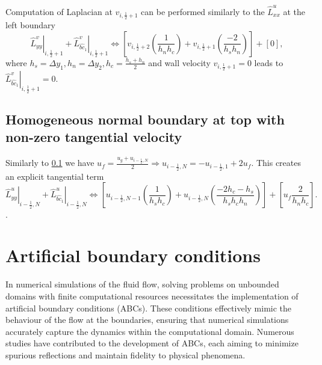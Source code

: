 \documentclass{article}
\numberwithin{equation}{section}
\begin{document}
Computation of Laplacian at $v_{i,\frac{1}{2}+1}$ can be performed similarly to the $\hat{L}_{xx}^u$ at the left boundary 
\begin{equation}
	\left.\hat{L}_{yy}^v\right|_{i,\frac{1}{2}+1}+\left.\hat{L}^v_{\hat{bc}_1}\right|_{i,\frac{1}{2}+1} \iff  \left [v_{i,\frac{1}{2}+2}\left(\frac{1}{h_n h_c}\right)+v_{i,\frac{1}{2}+1}\left(\frac{-2}{h_s h_n}\right)\right]+\left[0\right],
\end{equation}
where $h_s={\Delta y_1},h_n=\Delta y_2,h_c=\frac{h_s+h_n}{2}$ and wall velocity $v_{i,\frac{1}{2}+1}=0$ leads to $\left.\hat{L}^v_{\hat{bc}_1}\right|_{i,\frac{1}{2}+1}=0$.

\subsection{Homogeneous normal boundary at top with non-zero tangential velocity}\label{sec:laplaciat-top}

Similarly to \cref{sec:laplaciat-top} we have $u_{f} =\frac{u_g+u_{i-\frac{1}{2},N}}{2} \Rightarrow u_{i-\frac{1}{2},N}=-u_{i-\frac{1}{2},1}+2u_f$. This creates an explicit tangential term
\begin{equation}
	\left.\hat{L}_{yy}^u\right|_{i-\frac{1}{2},N}+\left.\hat{L}^u_{\hat{bc}_1}\right|_{i-\frac{1}{2},N} \iff  \left[ u_{i-\frac{1}{2},N-1}\left(\frac{1}{h_s h_c}\right)+u_{i-\frac{1}{2},N}\left(\frac{-2 h_c- h_s}{h_s h_c h_n}\right)\right]+\left[u_f\frac{2}{h_n h_c}\right].
\end{equation}.









\pagebreak
\section{Artificial boundary conditions}\label{sec:artificial-bc}

In numerical simulations of the fluid flow, solving problems on unbounded domains with finite computational resources necessitates the implementation of artificial boundary conditions (ABCs). These conditions effectively mimic the behaviour of the flow at the boundaries, ensuring that numerical simulations accurately capture the dynamics within the computational domain. Numerous studies have contributed to the development of ABCs, each aiming to minimize spurious reflections and maintain fidelity to physical phenomena.
\end{document}
